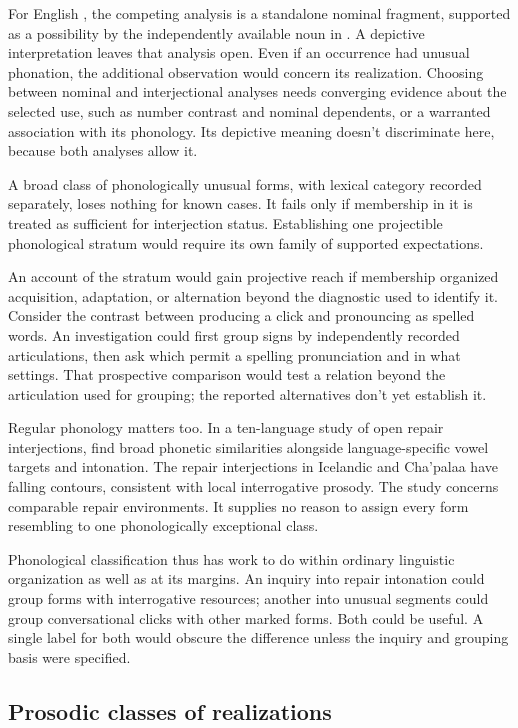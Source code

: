 \documentclass[12pt]{article}
\begin{document}
For English , the competing analysis is a
standalone nominal fragment, supported as a possibility by the independently
available noun in . A depictive interpretation leaves
that analysis open. Even if an occurrence had unusual phonation, the
additional observation would concern its realization. Choosing between
nominal and interjectional analyses needs converging evidence about the
selected use, such as number contrast and nominal dependents, or a
warranted association with its phonology. Its depictive meaning doesn't
discriminate here, because both analyses allow it.

A broad class of phonologically unusual forms, with lexical category
recorded separately, loses nothing for known cases. It fails only if
membership in it is treated as sufficient for interjection status.
Establishing one projectible
phonological stratum would require its own family of supported expectations.

An account of the stratum would gain projective reach if membership
organized acquisition, adaptation, or alternation beyond the diagnostic
used to identify it. Consider the contrast between producing a click
and pronouncing  as spelled words. An investigation
could first group signs by independently recorded articulations, then
ask which permit a spelling pronunciation and in what settings.
That prospective comparison would test a relation beyond the articulation
used for grouping; the reported alternatives don't yet establish it.

Regular phonology matters too. In a ten-language study of open repair
interjections, \textcite{dingemanse2013huh} find broad phonetic similarities
alongside language-specific vowel targets and intonation. The repair interjections in Icelandic and
Cha'palaa have falling contours, consistent with local interrogative
prosody. The study concerns comparable repair environments. It supplies
no reason to assign every form resembling  to one
phonologically exceptional class.

Phonological classification thus has work to do within ordinary linguistic
organization as well as at its margins. An inquiry into repair intonation
could group forms with interrogative resources; another into unusual
segments could group conversational clicks with other marked forms.
Both could be useful. A single label for both would obscure the difference
unless the inquiry and grouping basis were specified.

\subsection{Prosodic classes of realizations}
\end{document}
